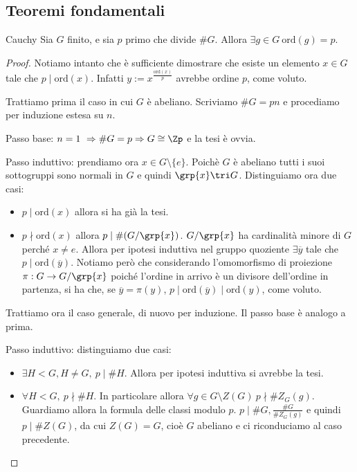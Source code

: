 \subsection{Teoremi fondamentali}
\begin{theorem}{Cauchy}
    Sia $G$ finito, e sia $p$ primo che divide $\#G$. Allora $\exists g\in G \ \text{ord}(g) = p$.
\end{theorem}
\begin{proof}
    Notiamo intanto che è sufficiente dimostrare che esiste un elemento $x \in G$ tale che $p \mid \text{ord}(x)$. Infatti $y := x^{\frac{\text{ord}(x)}{p}}$ avrebbe ordine $p$, come voluto.
    
    Trattiamo prima il caso in cui $G$ è abeliano. Scriviamo $\#G = pn$ e procediamo per induzione estesa su $n$.
    
    Passo base: $n = 1 \ \Rightarrow \#G = p \Rightarrow G \cong \Zp$ e la tesi è ovvia.
    
    Passo induttivo: prendiamo ora $x \in G \setminus \{e\}$. Poichè $G$ è abeliano tutti i suoi sottogruppi sono normali in $G$ e quindi $\grp{x} \tri G$. Distinguiamo ora due casi: 
    \begin{itemize}
        \item $p \mid \text{ord}(x)$ allora si ha già la tesi.
        \item $p \nmid \text{ord}(x)$ allora $p \mid \#(G/\grp{x})$. $G/\grp{x}$ ha cardinalità minore di $G$ perché $x \neq e$. Allora per ipotesi induttiva nel gruppo quoziente $\exists \overline y$ tale che $p \mid \text{ord}(\overline y)$. Notiamo però che considerando l'omomorfismo di proiezione $\pi : G \rightarrow G/\grp{x}$ poiché l'ordine in arrivo è un divisore dell'ordine in partenza, si ha che, se $\overline y = \pi(y)$, $p \mid \text{ord}(\overline y) \mid \text{ord}(y)$, come voluto.
    \end{itemize}
    Trattiamo ora il caso generale, di nuovo per induzione. Il passo base è analogo a prima.
    
    Passo induttivo: distinguiamo due casi:
    \begin{itemize}
        \item $\exists H < G, H \neq G, \ p \mid \#H$. Allora per ipotesi induttiva si avrebbe la tesi. 
        \item $\forall H < G, \ p \nmid \#H$. In particolare allora $\forall g \in G \setminus Z(G) \ p \nmid \#Z_G(g)$. Guardiamo allora la formula delle classi modulo $p$. $p \mid \#G, \frac{\#G}{\#Z_G(g)}$ e quindi $p \mid \#Z(G)$, da cui $Z(G) = G$, cioè $G$ abeliano e ci riconduciamo al caso precedente.
    \end{itemize}


\end{proof}
